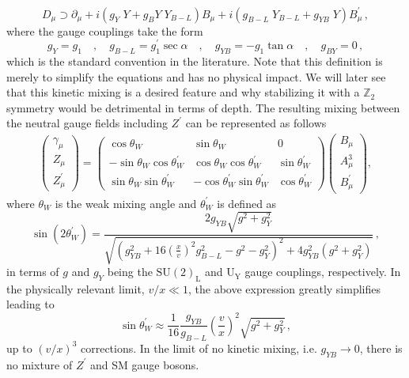 \documentclass[10pt]{book}
\renewcommand{\(}{\left(}
\renewcommand{\)}{\right)}
\renewcommand{\[}{\left[}
\renewcommand{\]}{\right]}
\begin{document}
\begin{equation}
D_\mu \supset \partial_\mu + i \(g_Y \; Y + g_BY \; Y_{B-L}\) B_\mu + i \(g_{B-L} \; Y_{B-L} + g_{YB} \; Y\) B_\mu^\prime\,,
\label{eq:newCov}
\end{equation}	
where the gauge couplings take the form
\begin{equation}
	g_Y = g_1 \quad , \quad 
	g_{B-L} = g_1^\prime \sec \alpha   \quad , \quad 
	g_{YB} = -g_1 \tan \alpha  \quad , \quad 
	g_{BY} = 0 \,,  
	\label{eq:new-g-simp}
\end{equation}
%
which is the standard convention in the literature.
%
Note that this definition is merely to simplify the equations and has no physical impact. 
%
We will later see that this kinetic mixing is a desired feature and why stabilizing it with a $\mathbb{Z}_2$ symmetry would be detrimental in terms of depth.
%
The resulting mixing between the neutral gauge fields including $Z^\prime$ can be represented as follows
%
\begin{equation}
\begin{aligned}
\begin{pmatrix}
\gamma_\mu \\
Z_\mu \\
Z^\prime_\mu
\end{pmatrix}
=
\begin{pmatrix}
\cos \theta_W & \sin \theta_W & 0\\
-\sin \theta_W \cos \theta_W^\prime & \cos \theta_W \cos \theta_W^\prime & \sin \theta_W^\prime \\
\sin \theta_W \sin \theta_W^\prime & -\cos \theta_W^\prime \sin \theta_W^\prime & \cos \theta_W^\prime
\end{pmatrix}
\begin{pmatrix}
B_\mu \\
A^3_\mu \\
B^\prime_\mu
\end{pmatrix} , 
\end{aligned}
\label{eq:g-Z-Zp}
\end{equation}
%
where $\theta_W$ is the weak mixing angle and $\theta^\prime_W$ is defined as
\begin{equation}
\sin(2 \theta^\prime_W) = \frac{2 g_{YB} \sqrt{g^2 + g_{Y}^2}}{\sqrt{(g_{YB}^2 + 16 (\frac{x}{v})^2 g_{B-L}^2 - g^2 - g_{Y}^2)^2 + 4 g_{YB}^2 (g^2 + g_{Y}^2)} }\,,
\label{eq:theta-p-full}
\end{equation}
%
in terms of $g$ and $g_{Y}$ being the $\mathrm{SU(2)_{L}}$ and $\mathrm{U_{Y}}$ gauge couplings, respectively. In the physically relevant limit, $v/x \ll 1$, the above expression greatly simplifies leading to
%
\begin{equation}
	\sin \theta_W^\prime \approx \dfrac{1}{16
	} \dfrac{g_{YB}}{g_{B-L}}\( \dfrac{v}{x} \)^2 \sqrt{g^2 + g_{Y}^2} \,,
	\label{eq:theta-p}
\end{equation}
%
up to $(v/x)^3$ corrections. In the limit of no kinetic mixing, i.e. $g_{YB} \to 0$, there is no mixture of $Z^\prime$ and SM gauge bosons. 
\end{document}
